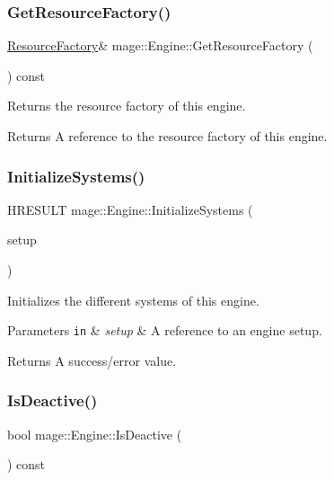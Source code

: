 \subsubsection{\texorpdfstring{Get\+Resource\+Factory()}{GetResourceFactory()}}
{\footnotesize\ttfamily \hyperlink{classmage_1_1_resource_factory}{Resource\+Factory}\& mage\+::\+Engine\+::\+Get\+Resource\+Factory (\begin{DoxyParamCaption}{ }\end{DoxyParamCaption}) const}

Returns the resource factory of this engine.

\begin{DoxyReturn}{Returns}
A reference to the resource factory of this engine. 
\end{DoxyReturn}
\hypertarget{classmage_1_1_engine_a2d0a2669520cce1316a176cc3e891502}{}\label{classmage_1_1_engine_a2d0a2669520cce1316a176cc3e891502} 
\subsubsection{\texorpdfstring{Initialize\+Systems()}{InitializeSystems()}}
{\footnotesize\ttfamily H\+R\+E\+S\+U\+LT mage\+::\+Engine\+::\+Initialize\+Systems (\begin{DoxyParamCaption}\item[{const \hyperlink{structmage_1_1_engine_setup}{Engine\+Setup} \&}]{setup }\end{DoxyParamCaption})\hspace{0.3cm}{\ttfamily [private]}}

Initializes the different systems of this engine.


\begin{DoxyParams}[1]{Parameters}
\mbox{\tt in}  & {\em setup} & A reference to an engine setup. \\
\hline
\end{DoxyParams}
\begin{DoxyReturn}{Returns}
A success/error value. 
\end{DoxyReturn}
\hypertarget{classmage_1_1_engine_a83c3ed26138932f8b17daa20526b100e}{}\label{classmage_1_1_engine_a83c3ed26138932f8b17daa20526b100e} 
\subsubsection{\texorpdfstring{Is\+Deactive()}{IsDeactive()}}
{\footnotesize\ttfamily bool mage\+::\+Engine\+::\+Is\+Deactive (\begin{DoxyParamCaption}{ }\end{DoxyParamCaption}) const\hspace{0.3cm}{\ttfamily [private]}}


